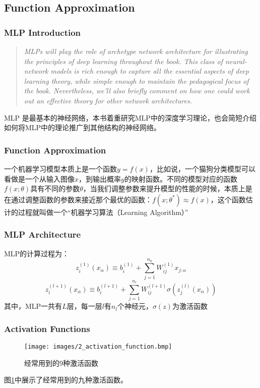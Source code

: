 \subsection{Function Approximation}

\subsubsection{MLP Introduction}
\begin{quote}
    \textit{MLPs will play the role of archetype network architecture for illustrating the principles of deep learning throughout the book. This class of neural-network models is rich enough to capture all the essential aspects of deep learning theory, while simple enough to maintain the pedagogical focus of the book. Nevertheless, we'll also briefly comment on how one could work out an effective theory for other network architectures.}

\end{quote}
MLP 是最基本的神经网络，本书着重研究MLP中的深度学习理论，也会简短介绍如何将MLP中的理论推广到其他结构的神经网络。

\subsubsection{Function Approximation}
一个机器学习模型本质上是一个函数$y=f(x)$，比如说，一个猫狗分类模型可以看做是一个从输入图像$x$，到输出概率$y$的映射函数。不同的模型对应的函数$f(x;\theta)$具有不同的参数$\theta$，当我们调整参数来提升模型的性能的时候，本质上是在通过调整函数的参数来接近那个最优的函数：$f(x;\theta^*)\approx f(x)$，这个函数估计的过程就叫做一个``机器学习算法（Learning Algorithm）''

\subsubsection{MLP Architecture}
MLP的计算过程为：
\begin{equation}
    z_i^{(1)}(x_\alpha)\equiv b_i^{(1)}+\sum^{n_0}_{j=1}W_{ij}^{(1)}x_{j:\alpha}
\end{equation}
\begin{equation}
    z_i^{(l+1)}(x_\alpha)\equiv b_i^{(l+1)}+\sum^{n_l}_{j=1}W_{ij}^{(l+1)}\sigma(z_j^{(l)}(x_\alpha))
\end{equation}
其中，MLP一共有$L$层，每一层$l$有$n_l$个神经元，$\sigma(z)$为激活函数

\subsubsection{Activation Functions}
\begin{figure}[!ht]
    \texttt{[image: images/2\_activation\_function.bmp]}
    \caption{经常用到的9种激活函数}
    \label{fig:2-activation}
\end{figure}
图\ref{fig:2-activation}中展示了经常用到的九种激活函数。

